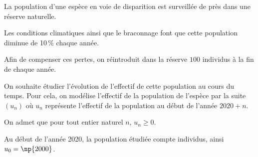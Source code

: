 \medskip

La population d'une espèce en voie de disparition est surveillée de près dans une réserve naturelle.

Les conditions climatiques ainsi que le braconnage font que cette population diminue de 10\,\% chaque année.

Afin de compenser ces pertes, on réintroduit dans la réserve $100$ individus à la fin de chaque année.

On souhaite étudier l'évolution de l'effectif de cette population au cours du temps. Pour cela, on modélise l'effectif de la population de l'espèce par la suite $\left(u_n\right)$ où $u_n$ représente l'effectif de la population au début de l'année $2020 + n$. 

On admet que pour tout entier naturel $n$,\: $u_n \geqslant 0$.

Au début de l'année 2020, la population étudiée compte  individus, ainsi $u_0 = \np{2000}$.

\medskip


